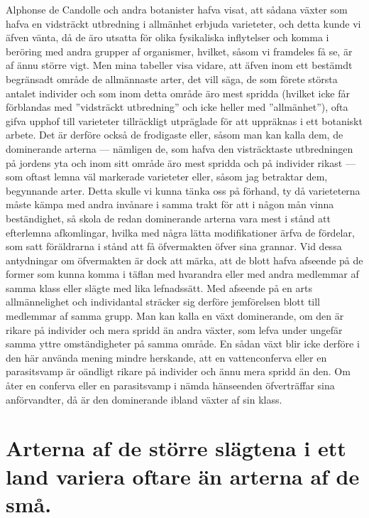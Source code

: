 Alphonse de Candolle och andra botanister hafva visat, att sådana växter som hafva en vidsträckt utbredning i allmänhet erbjuda varieteter, och detta kunde vi äfven vänta, då de äro utsatta för olika fysikaliska inflytelser och komma i beröring med andra grupper af organismer, hvilket, såsom vi framdeles få se, är af ännu större vigt. Men mina tabeller visa vidare, att äfven inom ett bestämdt begränsadt område de allmännaste arter, det vill säga, de som förete största antalet individer och som inom detta område äro mest spridda (hvilket icke får förblandas med ”vidsträckt utbredning” och icke heller med ”allmänhet”), ofta gifva upphof till varieteter tillräckligt utpräglade för att uppräknas i ett botaniskt arbete. Det är derföre också de frodigaste eller, såsom man kan kalla dem, de dominerande arterna — nämligen de, som hafva den visträcktaste utbredningen på jordens yta och inom sitt område äro mest spridda och på individer rikast — som oftast lemna väl markerade varieteter eller, såsom jag betraktar dem, begynnande arter. Detta skulle vi kunna tänka oss på förhand, ty då varieteterna måste kämpa med andra invånare i samma trakt för att i någon mån vinna beständighet, så skola de redan dominerande arterna vara mest i stånd att efterlemna afkomlingar, hvilka med några lätta modifikationer ärfva de fördelar, som satt föräldrarna i stånd att få öfvermakten öfver sina grannar. Vid dessa antydningar om öfvermakten är dock att märka, att de blott hafva afseende på de former som kunna komma i täflan med hvarandra eller med andra medlemmar af samma klass eller slägte med lika lefnadssätt. Med afseende på en arts allmännelighet och individantal sträcker sig derföre jemförelsen blott till medlemmar af samma grupp. Man kan kalla en växt dominerande, om den är rikare på individer och mera spridd än andra växter, som lefva under ungefär samma yttre omständigheter på samma område. En sådan växt blir icke derföre i den här använda mening mindre herskande, att en vattenconferva eller en parasitsvamp är oändligt rikare på individer och ännu mera spridd än den. Om åter en conferva eller en parasitsvamp i nämda hänseenden öfverträffar sina anförvandter, då är den dominerande ibland växter af sin klass.



\section[Större slägtena variera oftare]{Arterna af de större slägtena i ett land variera oftare än arterna af de små.}

